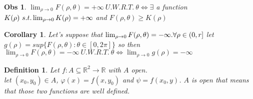\documentclass{article}
\newtheorem{observation}{Obs}
\newtheorem{corollary}{Corollary}
\newtheorem{definition}{Definition}
\begin{document}
    \begin{observation}
        $\lim_{\rho \to 0} F(\rho, \theta) = +\infty \ U.W.R.T. \ \theta \Longleftrightarrow \exists$ a function $K(\rho) \ s.t. \\ \lim_{\rho \to 0}K(\rho) = +\infty$ and $F(\rho,\theta) \geq K(\rho)$ 
    \end{observation}
    \begin{corollary}
        Let's suppose that $\lim_{\rho \to 0} F(\rho, \theta) = -\infty. \\ \forall \rho \in (0,r]$ let $g(\rho) = sup\{F(\rho, \theta) : \theta \in [0,2\pi] \}$ so then $\lim_{\rho \to 0} F(\rho, \theta) = -\infty \ U.W.R.T. \ \theta \Longleftrightarrow \lim_{\rho \to 0} g(\rho) = -\infty$
    \end{corollary}
    \begin{definition}
        Let $f : A \subseteq \mathbb{R}^2 \rightarrow \mathbb{R}$ with $A$ open.\\
        let $(x_0,y_0) \in A$, $\varphi(x) = f(x,y_0)$ and $\psi = f(x_0,y)$.
        $A$ is open that means that those two functions are well defined. 
    \end{definition}
\end{document}
